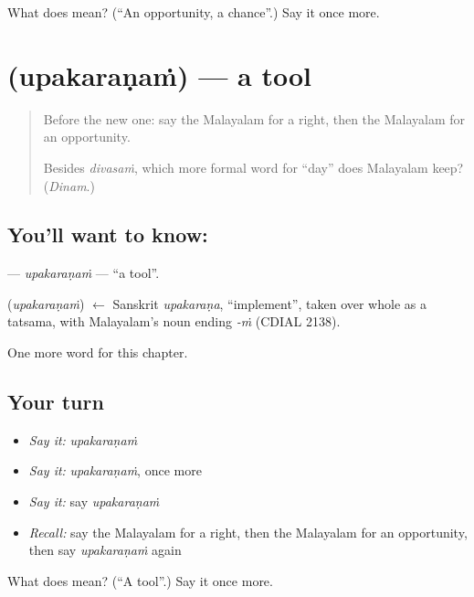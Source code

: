 \begin{tcolorbox}[breakable,colback=teal!4,colframe=teal!35!black,title={Before you move on}]
What does  mean? (\textquotedblleft{}An opportunity, a chance\textquotedblright{}.) Say it once more.
\end{tcolorbox}
\section[\texorpdfstring{\ml{ഉപകരണം} (upakaraṇaṁ)}{ഉപകരണം (upakaraṇaṁ)}]{ (upakaraṇaṁ) — a tool}

\label{lesson:ML-C142-upakaranam}



\begin{quote}
Before the new one: say the Malayalam for a right, then the Malayalam for an opportunity.

Besides \emph{divasaṁ}, which more formal word for \textquotedblleft{}day\textquotedblright{} does Malayalam keep? (\emph{Dinam}.)
\end{quote}

\subsection*{You'll want to know: }
\textbf{} — \emph{upakaraṇaṁ} — \textquotedblleft{}a tool\textquotedblright{}.

\begin{cousinweb}
\textbf{} (\emph{upakaraṇaṁ}) $\leftarrow$ Sanskrit \emph{upakaraṇa}, \textquotedblleft{}implement\textquotedblright{}, taken over whole as a tatsama, with Malayalam's noun ending \emph{-ṁ} (CDIAL 2138).
\end{cousinweb}

\begin{grammarlens}[title={What you've built}]
One more word for this chapter.
\end{grammarlens}

\subsection*{Your turn}
\begin{itemize}
\raggedright
  \item \emph{Say it:} \emph{upakaraṇaṁ}
  \item \emph{Say it:} \emph{upakaraṇaṁ}, once more
  \item \emph{Say it:} say \emph{upakaraṇaṁ}
  \item \emph{Recall:} say the Malayalam for a right, then the Malayalam for an opportunity, then say \emph{upakaraṇaṁ} again
\end{itemize}

\begin{tcolorbox}[breakable,colback=teal!4,colframe=teal!35!black,title={Before you move on}]
What does  mean? (\textquotedblleft{}A tool\textquotedblright{}.) Say it once more.
\end{tcolorbox}
